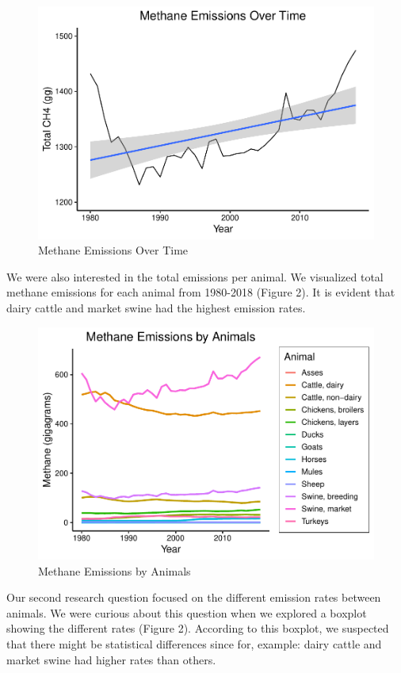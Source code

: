 \documentclass[
  12pt,
]{article}
\begin{document}
\begin{figure}
\centering
\includegraphics{Methane_Project_Template_files/figure-latex/unnamed-chunk-2-1.pdf}
\caption{Methane Emissions Over Time}
\end{figure}

We were also interested in the total emissions per animal. We visualized
total methane emissions for each animal from 1980-2018 (Figure 2). It is
evident that dairy cattle and market swine had the highest emission
rates.

\begin{figure}
\centering
\includegraphics{Methane_Project_Template_files/figure-latex/unnamed-chunk-3-1.pdf}
\caption{Methane Emissions by Animals}
\end{figure}

Our second research question focused on the different emission rates
between animals. We were curious about this question when we explored a
boxplot showing the different rates (Figure 2). According to this
boxplot, we suspected that there might be statistical differences since
for, example: dairy cattle and market swine had higher rates than
others.
\end{document}
